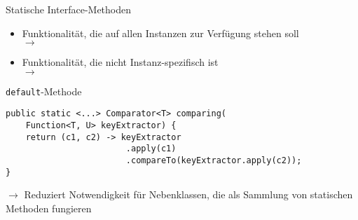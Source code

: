 \begin{frame}[fragile]{Statische Interface-Methoden}
    \begin{itemize}
        \item Funktionalität, die auf allen Instanzen zur Verfügung stehen soll \pause
        \\ $\rightarrow$  \pause {} \pause
        \item Funktionalität, die nicht Instanz-spezifisch ist \pause
        \\ $\rightarrow$  \pause {} \pause
    \end{itemize}

    \begin{center}
        \begin{minipage}[b]{0.75\textwidth}
            \begin{block}{\texttt{default}-Methode \citep{goetz13}}
                \begin{lstlisting}  
public static <...> Comparator<T> comparing(
    Function<T, U> keyExtractor) {
    return (c1, c2) -> keyExtractor
                        .apply(c1)
                        .compareTo(keyExtractor.apply(c2));
}
                \end{lstlisting}
            \end{block}
        \end{minipage}
    \end{center}

    $\rightarrow$ Reduziert Notwendigkeit für Nebenklassen, die als Sammlung von statischen
    Methoden fungieren
\end{frame}